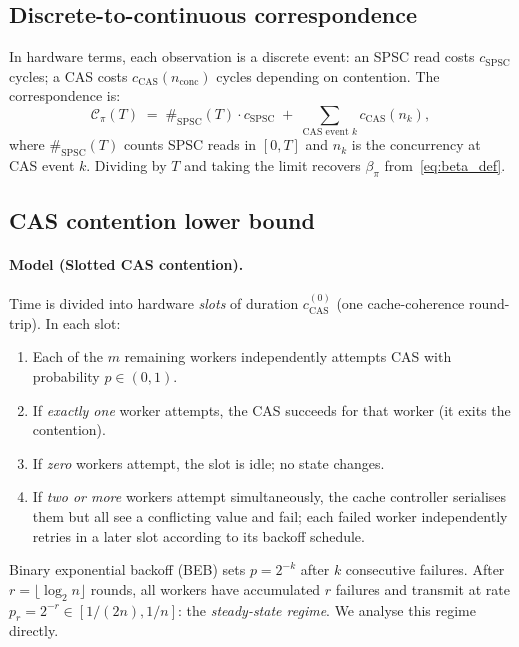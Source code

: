 \documentclass[11pt,a4paper]{report}
\begin{document}
\subsection{Discrete-to-continuous correspondence}

In hardware terms, each observation is a discrete event: an SPSC
read costs $c_{\mathrm{SPSC}}$ cycles; a CAS costs
$c_{\mathrm{CAS}}(n_{\mathrm{conc}})$ cycles depending on contention.
The correspondence is:
\[
  \mathcal{C}_\pi(T)
  \;=\;
  \#_{\mathrm{SPSC}}(T)\cdot c_{\mathrm{SPSC}}
  \;+\;
  \sum_{\text{CAS event }k} c_{\mathrm{CAS}}(n_k),
\]
where $\#_{\mathrm{SPSC}}(T)$ counts SPSC reads in $[0,T]$ and $n_k$
is the concurrency at CAS event $k$.
Dividing by $T$ and taking the limit recovers $\beta_\pi$
from~\eqref{eq:beta_def}.

\subsection{CAS contention lower bound}

\paragraph{Model (Slotted CAS contention).}
Time is divided into hardware \emph{slots} of duration $c_{\mathrm{CAS}}^{(0)}$
(one cache-coherence round-trip).  In each slot:
\begin{enumerate}[label=(\roman*),nosep]
  \item Each of the $m$ remaining workers independently attempts CAS
        with probability $p \in (0,1)$.
  \item If \emph{exactly one} worker attempts, the CAS succeeds for that
        worker (it exits the contention).
  \item If \emph{zero} workers attempt, the slot is idle; no state changes.
  \item If \emph{two or more} workers attempt simultaneously, the cache
        controller serialises them but all see a conflicting value
        and fail; each failed worker independently retries in a later slot
        according to its backoff schedule.
\end{enumerate}
Binary exponential backoff (BEB) sets $p = 2^{-k}$ after $k$ consecutive
failures.  After $r = \lfloor\log_2 n\rfloor$ rounds, all workers have
accumulated $r$ failures and transmit at rate $p_r = 2^{-r} \in [1/(2n), 1/n]$:
the \emph{steady-state regime}.  We analyse this regime directly.
\end{document}

